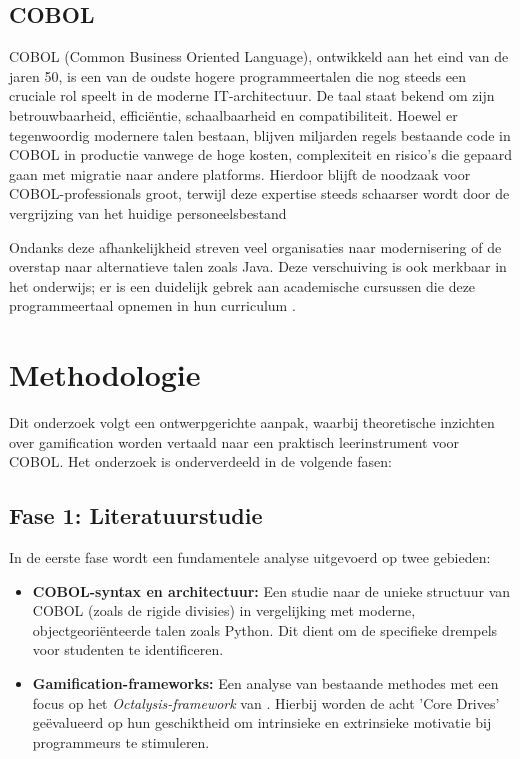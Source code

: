 \subsection{COBOL}
COBOL (Common Business Oriented Language), ontwikkeld aan het eind van de jaren 50, is een van de oudste hogere programmeertalen die nog steeds een cruciale rol speelt in de moderne IT-architectuur. 
De taal staat bekend om zijn betrouwbaarheid, efficiëntie, schaalbaarheid en compatibiliteit. 
Hoewel er tegenwoordig modernere talen bestaan, blijven miljarden regels bestaande code in COBOL in productie vanwege de hoge kosten, complexiteit en risico's die gepaard gaan met migratie naar andere platforms. 
Hierdoor blijft de noodzaak voor COBOL-professionals groot, terwijl deze expertise steeds schaarser wordt door de vergrijzing van het huidige personeelsbestand \autocite{Upadhaya2023}

Ondanks deze afhankelijkheid streven veel organisaties naar modernisering of de overstap naar alternatieve talen zoals Java. 
Deze verschuiving is ook merkbaar in het onderwijs; er is een duidelijk gebrek aan academische cursussen die deze programmeertaal opnemen in hun curriculum \autocite{Upadhaya2023}.


\section{Methodologie}%
\label{sec:methodologie}

Dit onderzoek volgt een ontwerpgerichte aanpak, waarbij theoretische inzichten over gamification worden vertaald naar een praktisch leerinstrument voor COBOL. 
Het onderzoek is onderverdeeld in de volgende fasen:

\subsection{Fase 1: Literatuurstudie} 
In de eerste fase wordt een fundamentele analyse uitgevoerd op twee gebieden: 
\begin{itemize} 
    \item \textbf{COBOL-syntax en architectuur:} Een studie naar de unieke structuur van COBOL (zoals de rigide divisies) in vergelijking met moderne, objectgeoriënteerde talen zoals Python. 
    Dit dient om de specifieke drempels voor studenten te identificeren.
    \item \textbf{Gamification-frameworks:} Een analyse van bestaande methodes met een focus op het \textit{Octalysis-framework} van \textcite{Chou2015}. 
    Hierbij worden de acht 'Core Drives' geëvalueerd op hun geschiktheid om intrinsieke en extrinsieke motivatie bij programmeurs te stimuleren.
\end{itemize}

